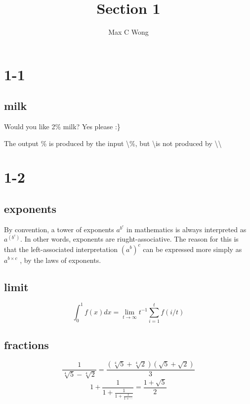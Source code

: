 \documentclass{article}
\begin{document}
\title{Section 1}
\author{Max C Wong}
\maketitle

\tableofcontents

\newpage

\section{1-1}

\subsection{milk}

Would you like 2\% milk? Yes please :\}

The output \% is produced by the input \textbackslash\%, but \textbackslash is not produced by \textbackslash\textbackslash

\section{1-2}

\subsection{exponents}

By convention, a tower of exponents $a^{b^c}$ in mathematics is always interpreted as $a^{(b^c)}$.
In other words, exponents are riught-associative. The reason for this is that the
left-associated interpretation ${(a^b)}^c$ can be expressed more simply as $a^{b\times c}$
, by the laws of exponents.

\subsection{limit}

$$\int^1_0 f(x)dx = \lim_{t \to \infty} t^{-1} \sum^t_{i=1}f(i/t)$$

\subsection{fractions}

$$\frac{1}{\sqrt[4]{5} - \sqrt[4]{2}} = \frac{(\sqrt[4]{5} + \sqrt[4]{2})(\sqrt{5} + \sqrt{2})}{3}$$
$$1 + \frac{1}{1 + \frac{1}{1 + \frac{1}{1 + \cdots}}} = \frac{1 + \sqrt{5}}{2}$$
\end{document}
